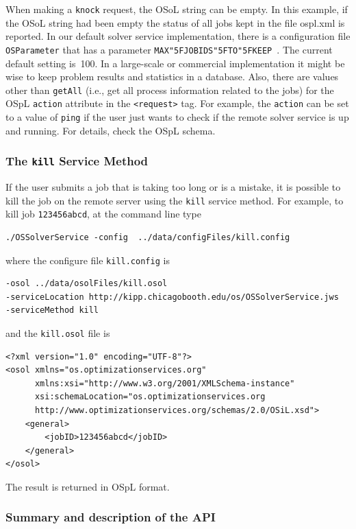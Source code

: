 \documentclass[11pt]{article}
\renewcommand{\_}{{\char"5F}}
\renewcommand{\{}{{\char"7B}}
\renewcommand{\}}{{\char"7D}}
\renewcommand{\^}{{\char"0D}}
\renewcommand{\'}{{\char"0D}}
\begin{document}
\begin{enumerate}[Step 1:]
When making a {\tt knock} request,  the OSoL string can be empty. In this example, if the OSoL string had been empty
the status of all jobs kept in the file ospl.xml is reported.  In our default solver service implementation,
there is a configuration file {\tt OSParameter} that has a parameter {\tt MAX\_JOBIDS\_TO\_KEEP }.
The current default setting is~100. In a large-scale or commercial implementation it might be wise to keep
problem results and statistics in a database. Also, there are values other than {\tt getAll} (i.e., get all
process information related to the jobs) for the OSpL {\tt action} attribute in the {\tt <request>} tag.
For example, the {\tt action} can be set to a value of {\tt ping} if the user just wants
to check if the remote solver service is up and running. For details, check the OSpL schema.


\subsubsection{The  {\tt kill}   Service Method}

If the user submits a job that is taking too long or is a mistake, it is possible to kill the job on the remote server using the {\tt kill} service method.
For example, to kill job {\tt 123456abcd}, at the command line type
\begin{verbatim}
./OSSolverService -config  ../data/configFiles/kill.config
\end{verbatim}
where the configure file {\tt kill.config} is
\begin{verbatim}
-osol ../data/osolFiles/kill.osol
-serviceLocation http://kipp.chicagobooth.edu/os/OSSolverService.jws
-serviceMethod kill
\end{verbatim}
and the {\tt kill.osol} file is
\begin{verbatim}
<?xml version="1.0" encoding="UTF-8"?>
<osol xmlns="os.optimizationservices.org"
      xmlns:xsi="http://www.w3.org/2001/XMLSchema-instance"
      xsi:schemaLocation="os.optimizationservices.org
      http://www.optimizationservices.org/schemas/2.0/OSiL.xsd">
    <general>
        <jobID>123456abcd</jobID>
    </general>
</osol>
\end{verbatim}

The result is returned in  OSpL format.



\subsubsection{Summary and description of the API}


\end{enumerate}
\end{document}
